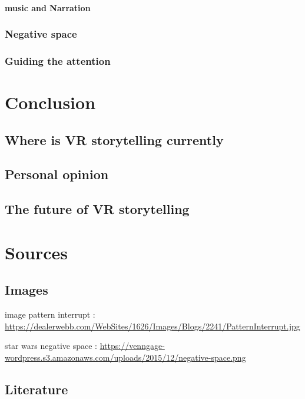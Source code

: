 \documentclass{report}
\begin{document}
				\subsubsection{music and Narration}
				
				
				
				\subsection{Negative space}
				\subsection{Guiding the attention}
				
				\chapter{Conclusion}
				\section{Where is VR storytelling currently}
				
				\section{Personal opinion}
				
				\section{The future of VR storytelling}
				
				\chapter{Sources}
				
				\section{Images}
				
				\cite{Nobody06}
				image pattern interrupt : \href{https://dealerwebb.com/WebSites/1626/Images/Blogs/2241/PatternInterrupt.jpg}{https://dealerwebb.com/WebSites/1626/Images/Blogs/2241/PatternInterrupt.jpg}
				
				star wars negative space : \href{https://venngage-wordpress.s3.amazonaws.com/uploads/2015/12/negative-space.png}{https://venngage-wordpress.s3.amazonaws.com/uploads/2015/12/negative-space.png}
				
				\section{Literature}
				
				
				
		
\end{document}

